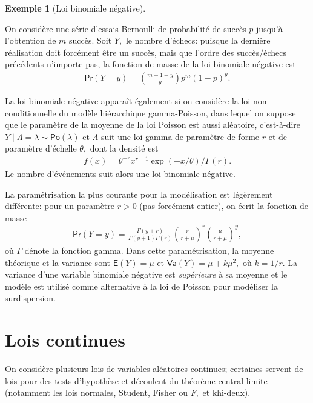 \documentclass[
  11pt,
  letterpaper,
]{scrbook}
\theoremstyle{plain}
\theoremstyle{plain}
\theoremstyle{definition}
\newtheorem{example}{Exemple}[chapter]
\theoremstyle{definition}
\theoremstyle{remark}
\begin{document}
\begin{example}[Loi binomiale
négative]\protect\hypertarget{exm-loibinneg}{}\label{exm-loibinneg}

On considère une série d'essais Bernoulli de probabilité de succès \(p\)
jusqu'à l'obtention de \(m\) succès. Soit \(Y,\) le nombre d'échecs:
puisque la dernière réalisation doit forcément être un succès, mais que
l'ordre des succès/échecs précédents n'importe pas, la fonction de masse
de la loi binomiale négative est \begin{align*}
\mathsf{Pr}(Y=y)= \binom{m-1+y}{y} p^m (1-p)^{y}.
\end{align*}

La loi binomiale négative apparaît également si on considère la loi
non-conditionnelle du modèle hiérarchique gamma-Poisson, dans lequel on
suppose que le paramètre de la moyenne de la loi Poisson est aussi
aléatoire, c'est-à-dire
\(Y \mid \Lambda=\lambda \sim \mathsf{Po}(\lambda)\) et \(\Lambda\) suit
une loi gamma de paramètre de forme \(r\) et de paramètre d'échelle
\(\theta,\) dont la densité est \begin{align*}
f(x) = \theta^{-r}x^{r-1}\exp(-x/\theta)/\Gamma(r).\end{align*} Le
nombre d'événements suit alors une loi binomiale négative.

La paramétrisation la plus courante pour la modélisation est légèrement
différente: pour un paramètre \(r>0\) (pas forcément entier), on écrit
la fonction de masse \begin{align*}
\mathsf{Pr}(Y=y)=\frac{\Gamma(y+r)}{\Gamma(y+1)\Gamma(r)} \left(\frac{r}{r + \mu} \right)^{r} \left(\frac{\mu}{r+\mu}\right)^y,
\end{align*} où \(\Gamma\) dénote la fonction gamma. Dans cette
paramétrisation, la moyenne théorique et la variance sont
\(\mathsf{E}(Y)=\mu\) et \(\mathsf{Va}(Y)=\mu+k\mu^2,\) où \(k=1/r.\) La
variance d'une variable binomiale négative est \emph{supérieure} à sa
moyenne et le modèle est utilisé comme alternative à la loi de Poisson
pour modéliser la surdispersion.

\end{example}

\section{Lois continues}\label{lois-continues}

On considère plusieurs lois de variables aléatoires continues; certaines
servent de lois pour des tests d'hypothèse et découlent du théorème
central limite (notamment les lois normales, Student, Fisher ou \(F,\)
et khi-deux).
\end{document}
